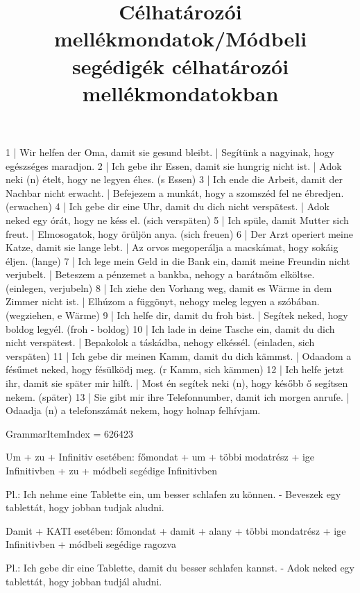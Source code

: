 \begin{exmp}
1 | Wir helfen der Oma, damit sie gesund bleibt. | Segítünk a nagyinak, hogy egészséges maradjon.
2 | Ich gebe ihr Essen, damit sie hungrig nicht ist. | Adok neki (n) ételt, hogy ne legyen éhes. (s Essen)
3 | Ich ende die Arbeit, damit der Nachbar nicht erwacht. | Befejezem a munkát, hogy a szomszéd fel ne ébredjen. (erwachen)
4 | Ich gebe dir eine Uhr, damit du dich nicht verspätest. | Adok neked egy órát, hogy ne késs el. (sich verspäten)
5 | Ich spüle, damit Mutter sich freut. | Elmosogatok, hogy örüljön anya. (sich freuen)
6 | Der Arzt operiert meine Katze, damit sie lange lebt. | Az orvos megoperálja a macskámat, hogy sokáig éljen. (lange)
7 | Ich lege mein Geld in die Bank ein, damit meine Freundin nicht verjubelt. | Beteszem a pénzemet a bankba, nehogy a barátnőm elköltse. (einlegen, verjubeln)
8 | Ich ziehe den Vorhang weg, damit es Wärme in dem Zimmer nicht ist. | Elhúzom a függönyt, nehogy meleg legyen a szóbában. (wegziehen, e Wärme)
9 | Ich helfe dir, damit du froh bist. | Segítek neked, hogy boldog legyél. (froh - boldog)
10 | Ich lade in deine Tasche ein, damit du dich nicht verspätest. | Bepakolok a táskádba, nehogy elkéssél. (einladen, sich verspäten)
11 | Ich gebe dir meinen Kamm, damit du dich kämmst. | Odaadom a fésűmet neked, hogy fésülködj meg. (r Kamm, sich kämmen)
12 | Ich helfe jetzt ihr, damit sie später mir hilft. | Most én segítek neki (n), hogy később ő segítsen nekem. (später)
13 | Sie gibt mir ihre Telefonnumber, damit ich morgen anrufe. | Odaadja (n) a telefonszámát nekem, hogy holnap felhívjam.
\end{exmp}

\title{Célhatározói mellékmondatok/Módbeli segédigék célhatározói mellékmondatokban}

GrammarItemIndex = 626423

\begin{desc}
Um + zu + Infinitiv esetében:
főmondat + um + többi modatrész + ige Infinitivben + zu + módbeli segédige Infinitivben

Pl.: Ich nehme eine Tablette ein, um besser schlafen zu können. - Beveszek egy tablettát, hogy jobban tudjak aludni.

Damit + KATI esetében:
főmondat + damit + alany + többi mondatrész + ige Infinitivben + módbeli segédige ragozva

Pl.: Ich gebe dir eine Tablette, damit du besser schlafen kannst. - Adok neked egy tablettát, hogy jobban tudjál aludni.
\end{desc}

